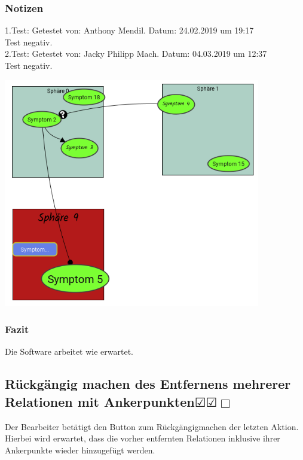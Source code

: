 \documentclass[enabledeprecatedfontcommands]{scrartcl}
\newcommand{\subsectiont}[2]{\subsection[#1]{#1{\normalsize\normalfont #2}}}
\newcommand{\leer}{$\Box$}
\newcommand{\ok}{$\CheckedBox$}
\begin{document}
\subsubsection{Notizen}
1.Test: Getestet von: Anthony Mendil. Datum: 24.02.2019 um 19:17 \\
Test negativ. \\
2.Test: Getestet von: Jacky Philipp Mach. Datum: 04.03.2019 um 12:37 \\
Test negativ.
\begin{center}
\includegraphics[height=10cm]{3_40.PNG}
\end{center}
\subsubsection{Fazit}
Die Software arbeitet wie erwartet.

\subsectiont{Rückgängig machen des Entfernens mehrerer Relationen mit Ankerpunkten}{\dotfill\ok\ok\leer}
Der Bearbeiter betätigt den Button zum Rückgängigmachen der letzten Aktion. Hierbei wird erwartet, dass die vorher entfernten Relationen inklusive ihrer Ankerpunkte wieder hinzugefügt werden.
\end{document}
